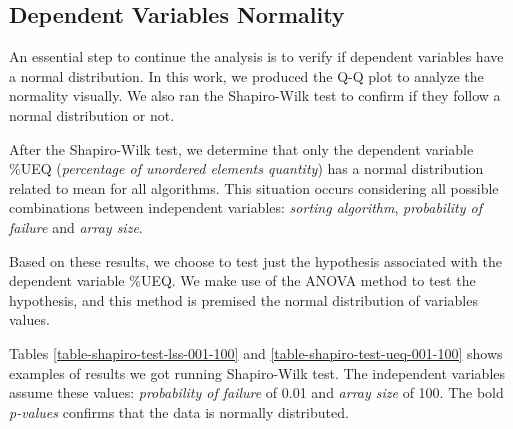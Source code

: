 \subsection{Dependent Variables Normality}

An essential step to continue the analysis is to verify if dependent variables have a normal distribution. In this work, we produced the Q-Q plot to analyze the normality visually. We also ran the Shapiro-Wilk \cite{shapiro1965analysis} test to confirm if they follow a normal distribution or not.

After the Shapiro-Wilk test, we determine that only the dependent variable \%UEQ (\textit{percentage of unordered elements quantity}) has a normal distribution related to mean for all algorithms. This situation occurs considering all possible combinations between independent variables: \textit{sorting algorithm}, \textit{probability of failure} and \textit{array size}.

Based on these results, we choose to test just the hypothesis associated with the dependent variable \%UEQ. We make use of the ANOVA method to test the hypothesis, and this method is premised the normal distribution of variables values.

Tables \ref{table-shapiro-test-lss-001-100} and \ref{table-shapiro-test-ueq-001-100} shows examples of results we got running Shapiro-Wilk test. The independent variables assume these values: \textit{probability of failure} of 0.01 and \textit{array size} of 100. The bold \textit{p-values} confirms that the data is normally distributed.

